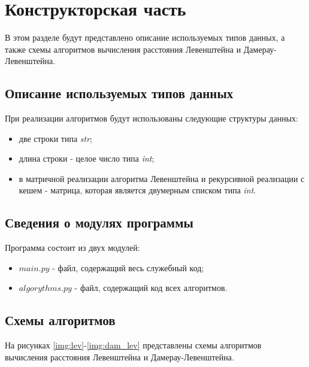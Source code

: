 \chapter{Конструкторская часть}
В этом разделе будут представлено описание используемых типов данных, а также схемы алгоритмов вычисления расстояния Левенштейна и Дамерау-Левенштейна.

\section{Описание используемых типов данных}
При реализации алгоритмов будут использованы следующие структуры данных:

\begin{itemize}
	\item две строки типа \textit{str};
	\item длина строки - целое число типа \textit{int};
	\item в матричной реализации алгоритма Левенштейна и рекурсивной реализации с кешем - матрица, которая является двумерным списком типа \textit{int}. 
\end{itemize}


\section{Сведения о модулях программы}
Программа состоит из двух модулей:
\begin{itemize}
	\item $main.py$ - файл, содержащий весь служебный код;
	\item $algorythms.py$ - файл, содержащий код всех алгоритмов. \newline
\end{itemize}


\section{Схемы алгоритмов}
На рисунках \ref{img:lev}-\ref{img:dam_lev} представлены схемы алгоритмов вычисления расстояния Левенштейна и Дамерау-Левенштейна.


